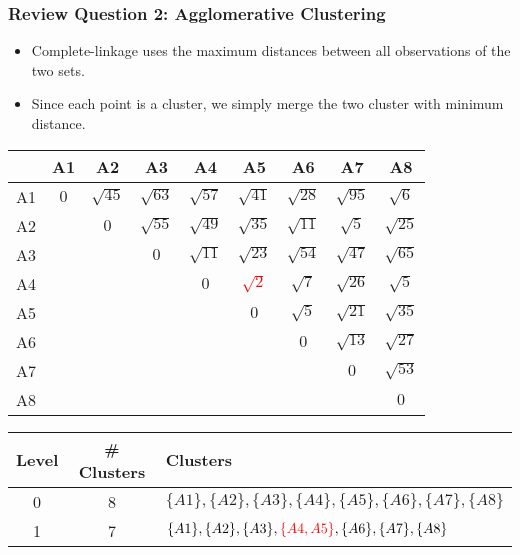\documentclass[aspectratio=169, 10pt]{beamer}
\begin{document}
\begin{frame}[t]
    \frametitle{Review Question 2: Agglomerative Clustering}
    \small

    \begin{itemize}
        \item Complete-linkage uses the maximum distances between all observations of the two sets.
        \item Since each point is a cluster, we simply merge the two cluster with minimum distance.
    \end{itemize}

    \begin{table}[]
        \scriptsize
        \begin{tabular}{c|cccccccc}
           & A1 & A2 & A3 & A4 & A5 & A6 & A7 & A8 \\ \hline
        A1 & $0$  & $\sqrt{45}$ & $\sqrt{63}$ & $\sqrt{57}$ & $\sqrt{41}$ & $\sqrt{28}$ & $\sqrt{95}$ & $\sqrt{6}$ \\
        A2 &    & $0$  & $\sqrt{55}$ & $\sqrt{49}$ & $\sqrt{35}$ & $\sqrt{11}$ & $\sqrt{5}$  & $\sqrt{25}$ \\
        A3 &    &    & $0$  & $\sqrt{11}$ & $\sqrt{23}$ & $\sqrt{54}$ & $\sqrt{47}$ & $\sqrt{65}$ \\
        A4 &    &    &    & $0$  & \textcolor{red}{$\sqrt{2}$} & $\sqrt{7}$  & $\sqrt{26}$ & $\sqrt{5}$  \\
        A5 &    &    &    &    & $0$  & $\sqrt{5}$  & $\sqrt{21}$ & $\sqrt{35}$ \\
        A6 &    &    &    &    &    & $0$  & $\sqrt{13}$ & $\sqrt{27}$ \\
        A7 &    &    &    &    &    &    & $0$  & $\sqrt{53}$ \\
        A8 &    &    &    &    &    &    &    & $0$ \\
        \end{tabular}
    \end{table}


    \begin{table}[]
        \scriptsize
        \begin{tabular}{c|c|l}
        Level & \# Clusters & Clusters \\ \hline
        0     & 8           & $\{A1\}, \{A2\}, \{A3\}, \{A4\}, \{A5\}, \{A6\}, \{A7\}, \{A8\}$\\
        1     & 7           & $\{A1\}, \{A2\}, \{A3\}, \textcolor{red}{\{A4, A5\}}, \{A6\}, \{A7\}, \{A8\}$\\
        \end{tabular}
    \end{table}
\end{frame}
\end{document}
